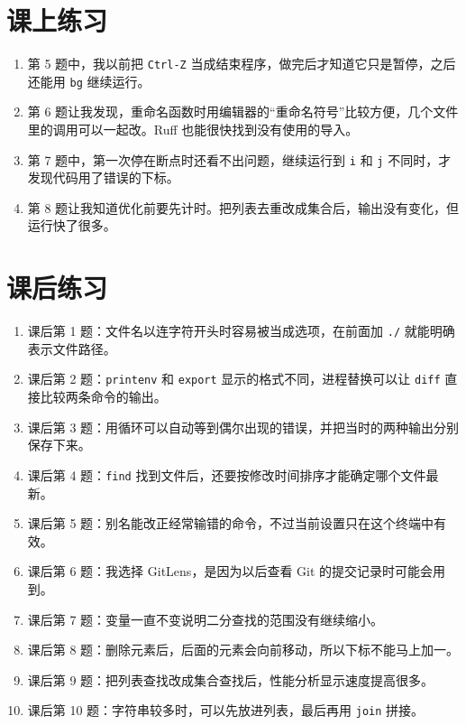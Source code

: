 \documentclass[a4paper,12pt]{report}
\begin{document}
\section{课上练习}
\begin{enumerate}
  \item {\large 第 5 题中，我以前把 \texttt{Ctrl-Z} 当成结束程序，做完后才知道它只是暂停，之后还能用 \texttt{bg} 继续运行。}
  \item {\large 第 6 题让我发现，重命名函数时用编辑器的“重命名符号”比较方便，几个文件里的调用可以一起改。Ruff 也能很快找到没有使用的导入。}
  \item {\large 第 7 题中，第一次停在断点时还看不出问题，继续运行到 \texttt{i} 和 \texttt{j} 不同时，才发现代码用了错误的下标。}
  \item {\large 第 8 题让我知道优化前要先计时。把列表去重改成集合后，输出没有变化，但运行快了很多。}
\end{enumerate}
\section{课后练习}
\begin{enumerate}
  \item {\large 课后第 1 题：文件名以连字符开头时容易被当成选项，在前面加 \texttt{./} 就能明确表示文件路径。}
  \item {\large 课后第 2 题：\texttt{printenv} 和 \texttt{export} 显示的格式不同，进程替换可以让 \texttt{diff} 直接比较两条命令的输出。}
  \item {\large 课后第 3 题：用循环可以自动等到偶尔出现的错误，并把当时的两种输出分别保存下来。}
  \item {\large 课后第 4 题：\texttt{find} 找到文件后，还要按修改时间排序才能确定哪个文件最新。}
  \item {\large 课后第 5 题：别名能改正经常输错的命令，不过当前设置只在这个终端中有效。}
  \item {\large 课后第 6 题：我选择 GitLens，是因为以后查看 Git 的提交记录时可能会用到。}
  \item {\large 课后第 7 题：变量一直不变说明二分查找的范围没有继续缩小。}
  \item {\large 课后第 8 题：删除元素后，后面的元素会向前移动，所以下标不能马上加一。}
  \item {\large 课后第 9 题：把列表查找改成集合查找后，性能分析显示速度提高很多。}
  \item {\large 课后第 10 题：字符串较多时，可以先放进列表，最后再用 \texttt{join} 拼接。}
\end{enumerate}
\end{document}

